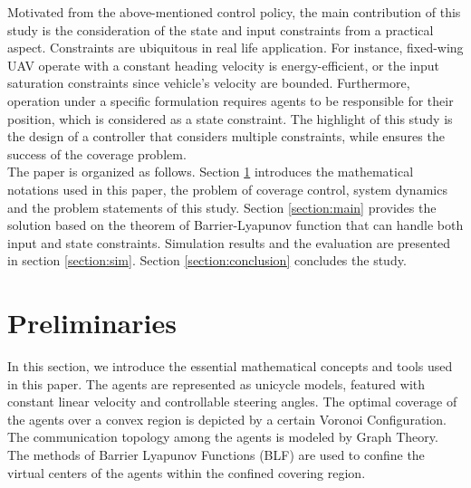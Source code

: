 \documentclass[journal]{IEEEtran}
\begin{document}
{	}
	
	

	
	{\color{red}Motivated from the above-mentioned control policy, the main contribution of this study is the consideration of the state and input constraints from a practical aspect. Constraints are ubiquitous in real life application. For instance, fixed-wing UAV operate with a constant heading velocity is energy-efficient, or the input saturation constraints since vehicle's velocity are bounded. Furthermore, operation under a specific formulation requires agents to be responsible for their position, which is considered as a state constraint. The highlight of this study is the design of a controller that considers multiple constraints, while ensures the success of the coverage problem. \\
		\indent The paper is organized as follows. Section \ref{section:pre} introduces the mathematical notations used in this paper, the problem of coverage control, system dynamics and the problem statements of this study. Section \ref{section:main} provides the solution based on the theorem of Barrier-Lyapunov function that can handle both input and state constraints. Simulation results and the evaluation are presented in section \ref{section:sim}. Section \ref{section:conclusion} concludes the study.}
	
	
	
	\section{Preliminaries} \label{section:pre}
	
	In this section, we introduce the essential mathematical concepts and tools used in this paper. The agents are represented as unicycle models, featured with constant linear velocity and controllable steering angles. The optimal coverage of the agents over a convex region is depicted by a certain Voronoi Configuration. The communication topology among the agents is modeled by Graph Theory. The methods of Barrier Lyapunov Functions (BLF) are used to confine the virtual centers of the agents within the confined covering region.
	
\end{document}
